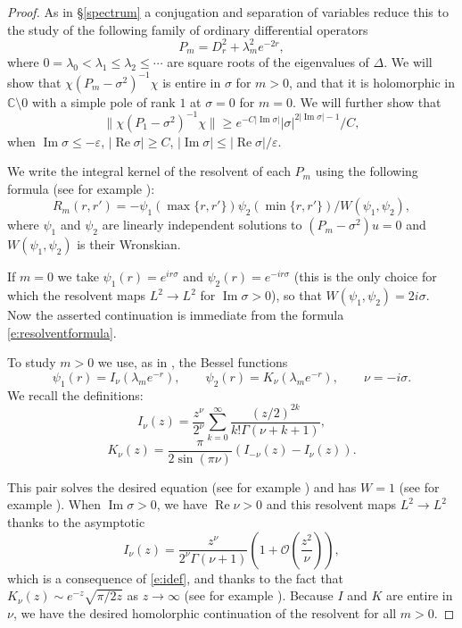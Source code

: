 \documentclass[reqno, 12pt]{amsart}
\newcommand \C {\mathbb{C}}
\newcommand \Oh {\mathcal{O}}
\newcommand \eps {\varepsilon}
\DeclareMathOperator \re {Re}
\DeclareMathOperator \im {Im}
\theoremstyle{definition}
\numberwithin{equation}{section}
\numberwithin{prop}{section}
\numberwithin{figure}{section}
\begin{document}
\begin{proof}
As in \S\ref{spectrum} a conjugation and separation of variables reduce this to the study of the following family of ordinary differential operators
\[
P_m = D_r^2 + \lambda_m^2 e^{-2r},
\]
where $0=\lambda_0 < \lambda_1 \le \lambda_2 \le \cdots$ are square roots of the eigenvalues of $\Delta$. We will show that $\chi(P_m - \sigma^2)^{-1}\chi$ is entire in $\sigma$ for $m > 0$, and that it is holomorphic in $\C \setminus 0$ with a simple pole of rank $1$ at $\sigma = 0$ for $m = 0$. We will further show that
\[
\|\chi (P_1 - \sigma^2)^{-1} \chi\| \ge e^{-C|\im\sigma|} |\sigma|^{2|\im\sigma|-1}/C,
\]
when $\im \sigma \le -\eps$, $|\re \sigma| \ge C$, $|\im\sigma|\le |\re\sigma|/\eps$.

We write the integral kernel of the resolvent of each $P_m$ using the following formula (see for example \cite[(1.25)]{tz}):
\begin{equation}\label{e:resolventformula}
R_m(r,r') = -\psi_1(\max\{r,r'\})\psi_2(\min\{r,r'\})/W(\psi_1,\psi_2),
\end{equation}
where $\psi_1$ and $\psi_2$ are linearly independent solutions to $(P_m -\sigma^2)u=0$ and $W(\psi_1,\psi_2)$ is their Wronskian. 

If $m = 0$ we take $\psi_1(r)=e^{i r \sigma}$  and $\psi_2(r) = e^{-i r \sigma}$ (this is the only choice for which the resolvent maps $L^2 \to L^2$ for $\im \sigma > 0$), so that $W(\psi_1,\psi_2)=2i\sigma$. Now the asserted continuation is immediate from the formula \eqref{e:resolventformula}. 

To study $m > 0$ we use, as in \cite[\S5.3]{b}, the Bessel functions
\begin{equation}\label{e:besselres}\psi_1(r) =I_\nu\left(\lambda_m e^{-r} \right), \qquad \psi_2(r) = K_\nu\left(\lambda_m e^{-r} \right), \qquad \nu = -i\sigma.\end{equation}
We recall the definitions:
\begin{equation}\label{e:idef}I_\nu(z) = \frac{z^\nu}{2^\nu} \sum_{k=0}^\infty \frac{(z/2)^{2k}}{k!\Gamma(\nu+k+1)},\end{equation}
\begin{equation}\label{e:kdef}K_\nu(z) = \frac \pi{2\sin(\pi\nu)} \left(I_{-\nu}(z) - I_\nu(z)\right).\end{equation}

This pair solves the desired equation (see for example \cite[Chapter 7, (8.01)]{Olver:Asymptotics}) and has $W=1$ (see for example \cite[Chapter 7, (8.07)]{Olver:Asymptotics}). When $\im \sigma > 0$, we have $\re \nu > 0$ and this resolvent maps $L^2 \to L^2$ thanks to the asymptotic
\begin{equation}\label{e:iseries} I_\nu(z) = \frac{z^\nu}{2^\nu \Gamma(\nu+1)}\left(1 + \Oh\left(\frac{z^2}{\nu}\right)\right),\end{equation} 
which is a consequence of \eqref{e:idef}, and thanks to the fact that $K_\nu(z) \sim e^{-z}\sqrt{\pi/2z}$ as $z \to \infty$
(see for example \cite[Chapter 7, (8.04)]{Olver:Asymptotics}). Because $I$ and $K$ are entire in $\nu$, we have the desired homolorphic continuation of the resolvent for all $m > 0$.



\end{proof}
\end{document}
